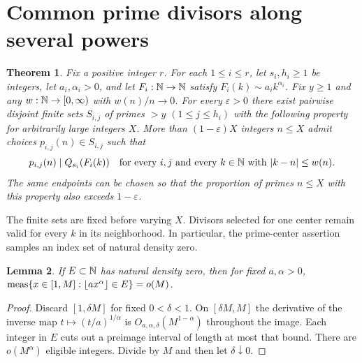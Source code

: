 \documentclass[11pt,a4paper,oneside,openany]{report}
\newtheorem{theorem}{Theorem}[section]
\newtheorem{lemma}[theorem]{Lemma}\newtheorem{proposition}[theorem]{Proposition}
\theoremstyle{remark}\newtheorem{remark}[theorem]{Remark}
\numberwithin{equation}{section}
\begin{document}
\section{Common prime divisors along several powers}
\begin{theorem}\label{ch8:thm:multi}
Fix a positive integer $r$. For each $1\le i\le r$, let $s_i,h_i\ge1$ be integers, let $a_i,\alpha_i>0$, and let $F_i:\mathbb N\to\mathbb N$ satisfy $F_i(k)\sim a_i k^{\alpha_i}$. Fix $y\ge1$ and any $w:\mathbb N\to[0,\infty)$ with $w(n)/n\to0$. For every $\varepsilon>0$ there exist pairwise disjoint finite sets $S_{i,j}$ of primes $>y$ $(1\le j\le h_i)$ with the following property for arbitrarily large integers $X$. More than $(1-\varepsilon)X$ integers $n\le X$ admit choices $p_{i,j}(n)\in S_{i,j}$ such that
\begin{equation}
 p_{i,j}(n)\mid Q_{s_i}(F_i(k))
 \quad\text{for every }i,j\text{ and every }k\in\mathbb N\text{ with }|k-n|\le w(n).
 \label{ch8:eq:window}
\end{equation}
The same endpoints can be chosen so that the proportion of primes $n\le X$ with this property also exceeds $1-\varepsilon$.
\end{theorem}
The finite sets are fixed before varying $X$. Divisors selected for one center remain valid for every $k$ in its neighborhood. In particular, the prime-center assertion samples an index set of natural density zero.

\begin{lemma}\label{ch8:lem:pull}
If $E\subset\mathbb N$ has natural density zero, then for fixed $a,\alpha>0$,
$\operatorname{meas}\{x\in[1,M]:\lfloor ax^\alpha\rfloor\in E\}=o(M)$.
\end{lemma}
\begin{proof}
Discard $[1,\delta M]$ for fixed $0<\delta<1$. On $[\delta M,M]$ the derivative of the inverse map $t\mapsto(t/a)^{1/\alpha}$ is $O_{a,\alpha,\delta}(M^{1-\alpha})$ throughout the image. Each integer in $E$ cuts out a preimage interval of length at most that bound. There are $o(M^\alpha)$ eligible integers. Divide by $M$ and then let $\delta\downarrow0$.
\end{proof}
\end{document}
